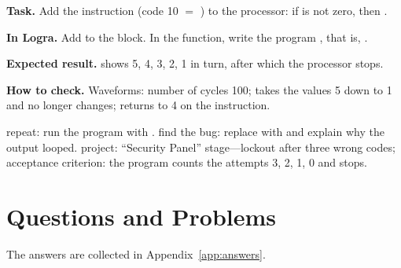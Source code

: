 \begin{diybox}
\textbf{Task.} Add the instruction  (code 10 $=$ ) to the processor: if  is not zero, then .

\textbf{In Logra.} Add  to the  block. In the  function, write the program , that is, .

\textbf{Expected result.}  shows 5, 4, 3, 2, 1 in turn, after which the processor stops.

\textbf{How to check.} Waveforms: number of cycles 100;  takes the values 5 down to 1 and no longer changes;  returns to 4 on the  instruction.

 repeat: run the program with .  find the bug: replace  with  and explain why the output looped.  project: ``Security Panel'' stage---lockout after three wrong codes; acceptance criterion: the program counts the attempts 3, 2, 1, 0 and stops.
\end{diybox}

\section{Questions and Problems}
\label{sec:tasks-cpu}

The answers are collected in Appendix~\ref{app:answers}.

